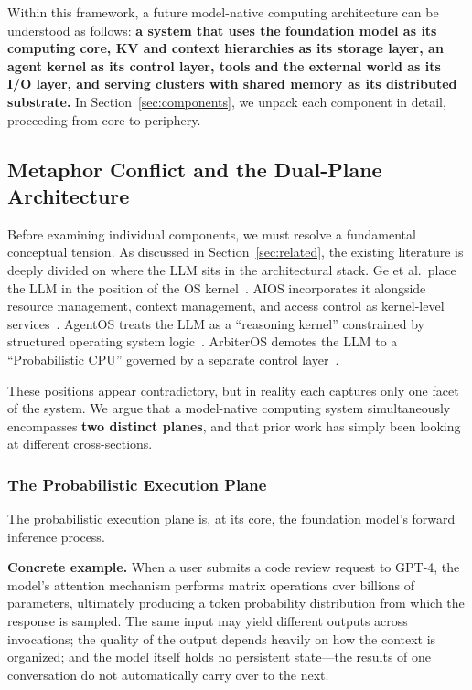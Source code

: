 \documentclass[11pt,a4paper]{article}
\begin{document}
Within this framework, a future model-native computing architecture can be understood as follows: \textbf{a system that uses the foundation model as its computing core, KV and context hierarchies as its storage layer, an agent kernel as its control layer, tools and the external world as its I/O layer, and serving clusters with shared memory as its distributed substrate.}
In Section~\ref{sec:components}, we unpack each component in detail, proceeding from core to periphery.

\subsection{Metaphor Conflict and the Dual-Plane Architecture}
\label{sec:dual-plane}

Before examining individual components, we must resolve a fundamental conceptual tension.
As discussed in Section~\ref{sec:related}, the existing literature is deeply divided on where the LLM sits in the architectural stack.
Ge et al.\ place the LLM in the position of the OS kernel~\cite{ge2023llmos}.
AIOS incorporates it alongside resource management, context management, and access control as kernel-level services~\cite{mei2024aios}.
AgentOS treats the LLM as a ``reasoning kernel'' constrained by structured operating system logic~\cite{agentos2025}.
ArbiterOS demotes the LLM to a ``Probabilistic CPU'' governed by a separate control layer~\cite{arbiteros2025}.

These positions appear contradictory, but in reality each captures only one facet of the system.
We argue that a model-native computing system simultaneously encompasses \textbf{two distinct planes}, and that prior work has simply been looking at different cross-sections.

\subsubsection{The Probabilistic Execution Plane}

The probabilistic execution plane is, at its core, the foundation model's forward inference process.

\textbf{Concrete example.}
When a user submits a code review request to GPT-4, the model's attention mechanism performs matrix operations over billions of parameters, ultimately producing a token probability distribution from which the response is sampled.
The same input may yield different outputs across invocations; the quality of the output depends heavily on how the context is organized; and the model itself holds no persistent state---the results of one conversation do not automatically carry over to the next.
\end{document}
